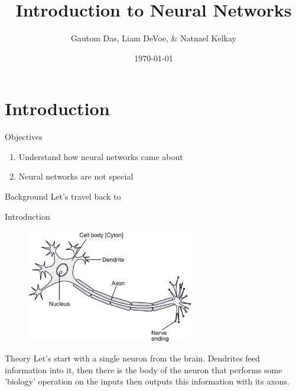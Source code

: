 \documentclass{beamer}
\title[Neural Networks]{Introduction to Neural Networks}
\author{Gautom Das, Liam DeVoe, \& Natnael Kelkay}
\institute{Montgomery Blair High School}
\date{\today}
\begin{document}
\begin{frame}
  \titlepage
\end{frame}


\section{Introduction}

\begin{frame}{Objectives}

\begin{enumerate}
	\item Understand how neural networks came about
	\newline
	\item Neural networks are not special
\end{enumerate}
\end{frame}

\begin{frame}{Background}
Let's travel back to 

\end{frame}


\begin{frame}{Introduction}

\begin{figure}
\includegraphics[width=0.65\textwidth]{12img}
\end{figure}


\vskip -0.3cm

\begin{block}{Theory}
Let's start with a single neuron from the brain. Dendrites feed information into it, then there is the body of the neuron that performs some 'biology' operation on the inputs then outputs this information with its axons.
\end{block}

\end{frame}
\end{document}
